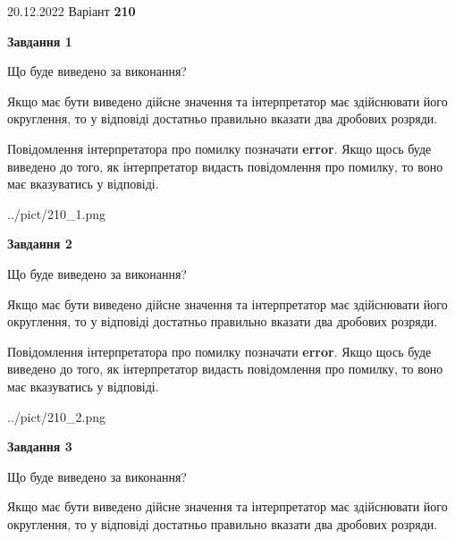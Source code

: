 \documentclass[12pt, ukrainian]{article}
\begin{document}
{20.12.2022 Варіант \No \textbf { 210 }\par}
{
\begin {Large}

{\begin {center}\textbf{Завдання 1}\end {center}}\par
Що буде виведено за виконання? \par

Якщо має бути виведено дійсне значення та інтерпретатор має здійснювати його округлення, 
то у відповіді достатньо правильно вказати два дробових розряди.

Повідомлення інтерпретатора про помилку позначати \textbf{error}.
Якщо щось буде виведено до того, як інтерпретатор видасть повідомлення про помилку, 
то воно має вказуватись у відповіді. \par

\begin{center}
	{../pict/210_1.png}
\end{center}
\newpage

{\begin {center}\textbf{Завдання 2}\end {center}}\par
Що буде виведено за виконання? \par

Якщо має бути виведено дійсне значення та інтерпретатор має здійснювати його округлення, 
то у відповіді достатньо правильно вказати два дробових розряди.

Повідомлення інтерпретатора про помилку позначати \textbf{error}.
Якщо щось буде виведено до того, як інтерпретатор видасть повідомлення про помилку, 
то воно має вказуватись у відповіді. \par

\begin{center}
	{../pict/210_2.png}
\end{center}
\newpage

{\begin {center}\textbf{Завдання 3}\end {center}}\par
Що буде виведено за виконання? \par

Якщо має бути виведено дійсне значення та інтерпретатор має здійснювати його округлення, 
то у відповіді достатньо правильно вказати два дробових розряди.


\end{Large}}
\end{document}
